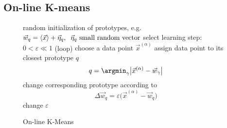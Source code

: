 \subsection{On-line K-means}


\begin{frame}{\subsecname}


\begin{figure}[!th]
\footnotesize
\removelatexerror
\begin{algorithm}[H]
  \DontPrintSemicolon
   random initialization of prototypes, e.g.\ $\vec{w}_{q} = \langle  \vec{x} \rangle +\vec{\eta}_{q},\hspace{0.2cm} \vec{\eta}_{q}  \text{ small random vector}$\;
  select learning step:   $0 < \varepsilon  \ll 1$\;
  \Begin(loop){
    choose a data point $\vec{x}^{(\alpha)}$ \;
    assign data point to its closest prototype $q$\;
    \[ q = \argmin_{\gamma} \big| \vec{x}^{(\alpha)} - \vec{w}_{\gamma} \big| \]
    change corresponding prototype according to\;
    \[ \Delta \vec{w}_q = \varepsilon \big( \vec{x}^{(\alpha)} - \vec{w}_{q} \big) \]
    change $\varepsilon$ \;
  }
  \label{alg:on-line-k-means}
  \caption{On-line K-Means}
\end{algorithm}
\end{figure}

\end{frame}

